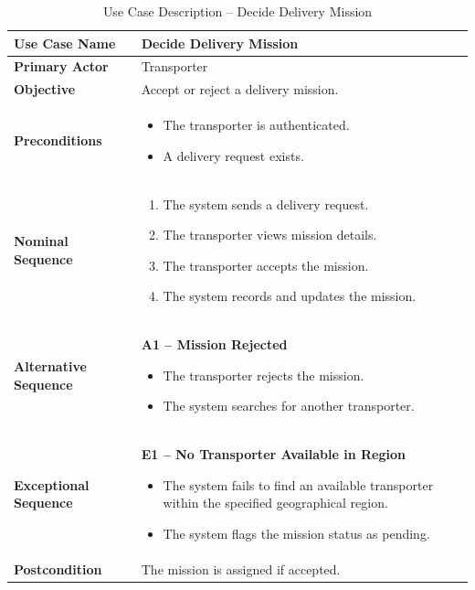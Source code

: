 \begin{table}[H]
	\centering
	\renewcommand{\arraystretch}{1.3}
	\begin{tabular}{|p{4cm}|p{10cm}|}
		\hline
		
		\textbf{Use Case Name} & Decide Delivery Mission \\ 
		\hline
		
		\textbf{Primary Actor} & Transporter \\ 
		\hline
		
		\textbf{Objective} & Accept or reject a delivery mission. \\ 
		\hline
		
		\textbf{Preconditions} &
		\begin{itemize}
			\item The transporter is authenticated.
			\item A delivery request exists.
		\end{itemize} \\ 
		\hline
		
		\textbf{Nominal Sequence} &
		\begin{enumerate}
			\item The system sends a delivery request.
			\item The transporter views mission details.
			\item The transporter accepts the mission.
			\item The system records and updates the mission.
		\end{enumerate} \\ 
		\hline
		
		\textbf{Alternative Sequence} &
		\textbf{A1 -- Mission Rejected}
		\begin{itemize}
			\item The transporter rejects the mission.
			\item The system searches for another transporter.
		\end{itemize} \\ 
		\hline
		
		\textbf{Exceptional Sequence} & 
		\textbf{E1 -- No Transporter Available in Region}
		\begin{itemize}
			\item The system fails to find an available transporter within the specified geographical region.
			\item The system flags the mission status as pending.
		\end{itemize} \\ 
		\hline
		
		\textbf{Postcondition} &
		The mission is assigned if accepted. \\ 
		\hline
		
	\end{tabular}
	\caption{Use Case Description -- Decide Delivery Mission}
\end{table}

